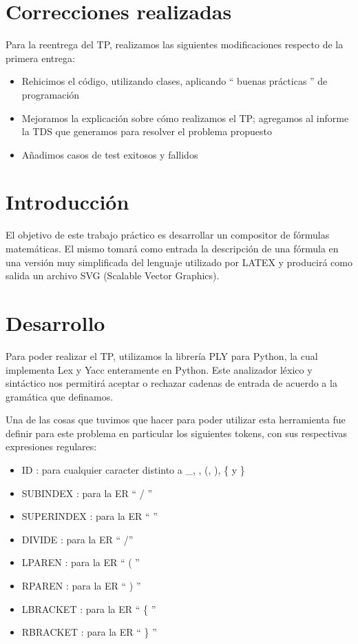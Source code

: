 \documentclass[a4paper, 10pt, twoside]{article}
\begin{document}
\newpage

\tableofcontents

\section{Correcciones realizadas}
Para la reentrega del TP, realizamos las siguientes modificaciones respecto de la primera entrega:
\begin{itemize}
  \item Rehicimos el código, utilizando clases, aplicando `` buenas prácticas '' de programación
  \item Mejoramos la explicación sobre cómo realizamos el TP; agregamos al informe la TDS que generamos para resolver el problema propuesto
  \item Añadimos casos de test exitosos y fallidos 
\end{itemize}

\newpage


\section{Introducción}
El objetivo de este trabajo práctico es desarrollar un compositor de fórmulas matemáticas. El mismo tomará como entrada la descripción de una fórmula en una versión muy simplificada del lenguaje utilizado por LATEX y producirá como salida un archivo SVG (Scalable Vector Graphics).

\section{Desarrollo}
Para poder realizar el TP, utilizamos la librería PLY para Python, la cual implementa Lex y Yacc enteramente en Python. Este analizador léxico y sintáctico nos permitirá aceptar o rechazar cadenas de entrada de acuerdo a la gramática que definamos.

Una de las cosas que tuvimos que hacer para poder utilizar esta herramienta fue definir para este problema en particular los siguientes tokens, con sus respectivas expresiones regulares:
\begin{itemize}
  \item ID : para cualquier caracter distinto a \_, \detokenize{^}, (, ), \{ y \}
  \item SUBINDEX : para la ER `` / ''
  \item SUPERINDEX : para la ER `` \detokenize{^} ''
  \item DIVIDE : para la ER `` /'' 
  \item LPAREN : para la ER `` ( '' 
  \item RPAREN : para la ER `` ) ''
  \item LBRACKET : para la ER `` \{ ''
  \item RBRACKET : para la ER `` \} ''
\end{itemize}
\end{document}
